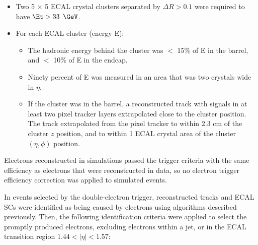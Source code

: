 \begin{itemize}
	\item Two 5 $\times$ 5 ECAL crystal clusters separated by $\Delta R > 0.1$ were required to have $\Et > 33$ $\GeV$.
	\item For each ECAL cluster (energy E):
	\begin{itemize}
		\item The hadronic energy behind the cluster was $<$ 15\% of E in the barrel, and $<$ 10\% of E in the endcap. 
		\item Ninety percent of E was measured in an area that was two crystals wide in $\eta$.
		\item If the cluster was in the barrel, a reconstructed track with signals in at least two pixel tracker layers 
			extrapolated close to the cluster position.  The track extrapolated from the pixel tracker to within $2.3$ cm 
			of the cluster $z$ position, and to within 1 ECAL crystal area of the cluster $(\eta,\phi)$ position.
	\end{itemize}
\end{itemize}

Electrons reconstructed in simulations passed the trigger criteria with the same efficiency as electrons that were reconstructed in data, 
so no electron trigger efficiency correction was applied to simulated events.

In events selected by the double-electron trigger, reconstructed tracks and ECAL SCs were identified as being caused by electrons using 
algorithms described previously.  Then, the following identification criteria were applied to select the promptly produced electrons, 
excluding electrons within a jet, or in the ECAL transition region $1.44 < |\eta| < 1.57$:

